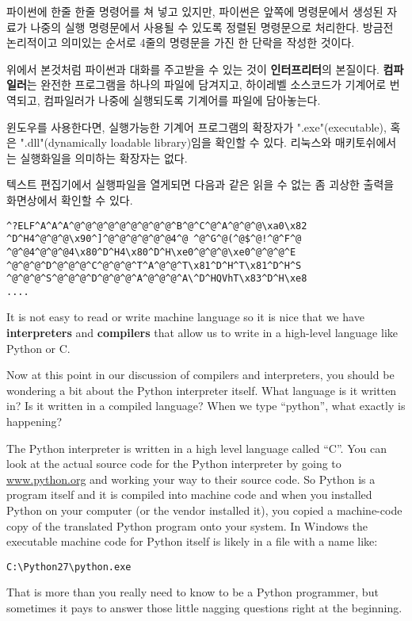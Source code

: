 파이썬에 한줄 한줄 명령어를 쳐 넣고 있지만, 파이썬은 앞쪽에 명령문에서 생성된 자료가 나중의 실행 명령문에서 사용될 수 있도록 정렬된 명령문으로 처리한다. 방금전 논리적이고 의미있는 순서로 4줄의 명령문을 가진 한 단락을 작성한 것이다.

위에서 본것처럼 파이썬과 대화를 주고받을 수 있는 것이 {\bf 인터프리터}의 본질이다. {\bf 컴파일러}는 완전한 프로그램을 하나의 파일에 담겨지고, 하이레벨 소스코드가 기계어로 번역되고, 컴파일러가 나중에 실행되도록 기계어를 파일에 담아놓는다.

윈도우를 사용한다면, 실행가능한 기계어 프로그램의 확장자가 ".exe"(executable), 혹은 ".dll"(dynamically loadable library)임을 확인할 수 있다. 리눅스와 매키토쉬에서는 실행화일을 의미하는 확장자는 없다.

텍스트 편집기에서 실행파일을 열게되면 다음과 같은 읽을 수 없는 좀 괴상한 출력을 화면상에서 확인할 수 있다.

\beforeverb
\begin{verbatim}
^?ELF^A^A^A^@^@^@^@^@^@^@^@^@^B^@^C^@^A^@^@^@\xa0\x82
^D^H4^@^@^@\x90^]^@^@^@^@^@^@4^@ ^@^G^@(^@$^@!^@^F^@
^@^@4^@^@^@4\x80^D^H4\x80^D^H\xe0^@^@^@\xe0^@^@^@^E
^@^@^@^D^@^@^@^C^@^@^@^T^A^@^@^T\x81^D^H^T\x81^D^H^S
^@^@^@^S^@^@^@^D^@^@^@^A^@^@^@^A\^D^HQVhT\x83^D^H\xe8
....
\end{verbatim}
\afterverb
%
It is not easy to read or write machine language so it is nice that we have
{\bf interpreters} and {\bf compilers} that allow us to write in a high-level
language like Python or C.

Now at this point in our discussion of compilers and interpreters, you should 
be wondering a bit about the Python interpreter itself.  What language is 
it written in?  Is it written in a compiled language?  When we type
``python'', what exactly is happening?

The Python interpreter is written in a high level language called ``C''.  
You can look at the actual source code for the Python interpreter by
going to \url{www.python.org} and working your way to their source code.
So Python is a program itself and it is compiled into machine code and
when you installed Python on your computer (or the vendor installed it),
you copied a machine-code copy of the translated Python program onto your
system.   In Windows the executable machine code for Python itself is likely
in a file with a name like:

\beforeverb
\begin{verbatim}
C:\Python27\python.exe
\end{verbatim}
\afterverb
%
That is more than you really need to know to be a Python programmer, but
sometimes it pays to answer those little nagging questions right at 
the beginning.


